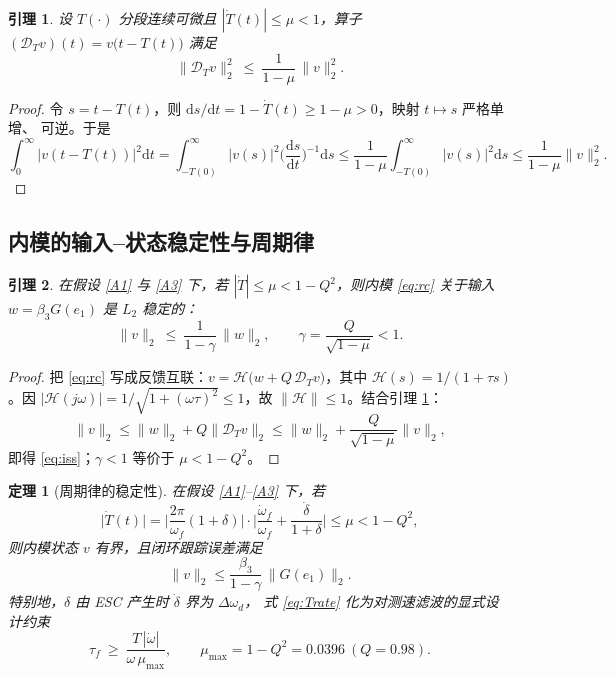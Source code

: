 \documentclass[UTF8,fontset=windows,a4paper,11pt]{ctexart}
\newtheorem{theorem}{定理}
\newtheorem{lemma}{引理}
\begin{document}
\begin{lemma}\label{lem:delay}
设 $T(\cdot)$ 分段连续可微且 $|\dot T(t)|\le\mu<1$，算子
$(\mathcal{D}_T v)(t)=v\big(t-T(t)\big)$ 满足
\begin{equation}
\|\mathcal{D}_T v\|_2^2\ \le\ \frac{1}{1-\mu}\,\|v\|_2^2 .
\label{eq:dgain}
\end{equation}
\end{lemma}

\begin{proof}
令 $s=t-T(t)$，则 $\mathrm{d}s/\mathrm{d}t=1-\dot T(t)\ge1-\mu>0$，映射 $t\mapsto s$ 严格单增、
可逆。于是
\[
\int_0^\infty\big|v(t-T(t))\big|^2\mathrm{d}t
=\int_{-T(0)}^{\infty}\big|v(s)\big|^2\Big(\frac{\mathrm{d}s}{\mathrm{d}t}\Big)^{-1}\mathrm{d}s
\le\frac{1}{1-\mu}\int_{-T(0)}^{\infty}\big|v(s)\big|^2\mathrm{d}s
\le\frac{1}{1-\mu}\|v\|_2^2 .
\]
\end{proof}

\subsection{内模的输入--状态稳定性与周期律}

\begin{lemma}\label{lem:iss}
在假设 \ref{A1} 与 \ref{A3} 下，若 $|\dot T|\le\mu<1-Q^2$，则内模 \eqref{eq:rc}
关于输入 $w=\beta_3G(e_1)$ 是 $L_2$ 稳定的：
\begin{equation}
\|v\|_2\ \le\ \frac{1}{1-\gamma}\,\|w\|_2,\qquad
\gamma=\frac{Q}{\sqrt{1-\mu}}<1 .
\label{eq:iss}
\end{equation}
\end{lemma}

\begin{proof}
把 \eqref{eq:rc} 写成反馈互联：$v=\mathcal{H}\big(w+Q\,\mathcal{D}_T v\big)$，其中
$\mathcal{H}(s)=1/(1+\tau s)$。因 $|\mathcal{H}(j\omega)|=1/\sqrt{1+(\omega\tau)^2}\le1$，故
$\|\mathcal{H}\|\le1$。结合引理 \ref{lem:delay}：
\[
\|v\|_2\le\|w\|_2+Q\|\mathcal{D}_T v\|_2
\le\|w\|_2+\frac{Q}{\sqrt{1-\mu}}\|v\|_2 ,
\]
即得 \eqref{eq:iss}；$\gamma<1$ 等价于 $\mu<1-Q^{2}$。
\end{proof}

\begin{theorem}[周期律的稳定性]\label{thm:T}
在假设 \ref{A1}--\ref{A3} 下，若
\begin{equation}
\big|\dot T(t)\big|=\Big|\frac{2\pi}{\omega_f}(1+\delta)\Big|\cdot
\Big|\frac{\dot\omega_f}{\omega_f}+\frac{\dot\delta}{1+\delta}\Big|
\le\mu<1-Q^{2},
\label{eq:Trate}
\end{equation}
则内模状态 $v$ 有界，且闭环跟踪误差满足
\begin{equation}
\|v\|_2\le\frac{\beta_3}{1-\gamma}\,\big\|G(e_1)\big\|_2 .
\label{eq:thm1}
\end{equation}
特别地，$\delta$ 由 ESC 产生时 $\dot\delta$ 界为 $\Delta\omega_d$，
式 \eqref{eq:Trate} 化为对测速滤波的显式设计约束
\begin{equation}
\tau_f\ \ge\ \frac{T\,|\dot\omega|}{\omega\,\mu_{\max}},\qquad
\mu_{\max}=1-Q^{2}=0.0396\ (Q=0.98).
\label{eq:tauf}
\end{equation}
\end{theorem}
\end{document}
